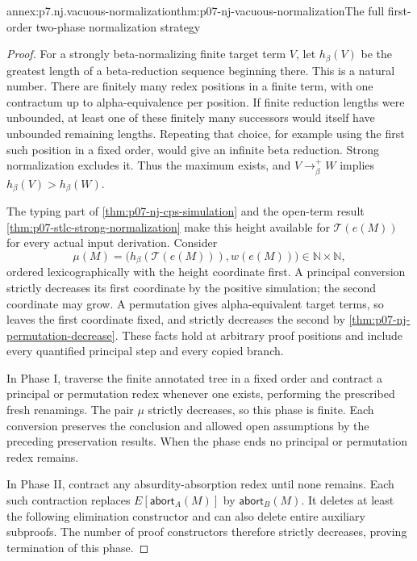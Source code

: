 \begin{annexitem}{annex:p7.nj.vacuous-normalization}{thm:p07-nj-vacuous-normalization}{The full first-order two-phase normalization strategy}
\begin{proof}
For a strongly beta-normalizing finite target term \(V\), let
\(h_\beta(V)\) be the greatest length of a beta-reduction
sequence beginning there. This is a natural number. There
are finitely many redex positions in a finite term, with
one contractum up to alpha-equivalence per position. If
finite reduction lengths were unbounded, at least one of
these finitely many successors would itself have unbounded
remaining lengths. Repeating that choice, for example using
the first such position in a fixed order, would give an
infinite beta reduction. Strong normalization excludes it.
Thus the maximum exists, and \(V\to_\beta^+W\) implies
\(h_\beta(V)>h_\beta(W)\).

The typing part of \cref{thm:p07-nj-cps-simulation} and the
open-term result \cref{thm:p07-stlc-strong-normalization}
make this height available for \(\mathcal T(e(M))\) for
every actual input derivation. Consider
\[
 \mu(M)=\bigl(h_\beta(\mathcal T(e(M))),w(e(M))\bigr)
                  \in\mathbb N\times\mathbb N,
\]
ordered lexicographically with the height coordinate first.
A principal conversion strictly decreases its first coordinate
by the positive simulation; the second coordinate may grow.
A permutation gives alpha-equivalent target terms, so leaves
the first coordinate fixed, and strictly decreases the second
by \cref{thm:p07-nj-permutation-decrease}. These facts hold
at arbitrary proof positions and include every quantified
principal step and every copied branch.

In Phase I, traverse the finite annotated tree in a fixed
order and contract a principal or permutation redex whenever
one exists, performing the prescribed fresh renamings.
The pair \(\mu\) strictly decreases, so this phase is finite.
Each conversion preserves the conclusion and allowed open
assumptions by the preceding preservation results. When the
phase ends no principal or permutation redex remains.

In Phase II, contract any absurdity-absorption redex until
none remains. Each such contraction replaces
\(E[\mathsf{abort}_A(M)]\) by \(\mathsf{abort}_B(M)\).
It deletes at least the following elimination constructor
and can also delete entire auxiliary subproofs. The number
of proof constructors therefore strictly decreases, proving
termination of this phase.


\end{proof}
\end{annexitem}
